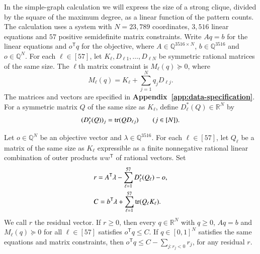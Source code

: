 In the simple-graph calculation we will express the size of a strong
clique, divided by the square of the maximum degree, as a linear
function of the pattern counts. The calculation uses a system with $N=23{,}789$ coordinates, $3{,}516$ linear equations and
$57$ positive semidefinite matrix constraints. Write $Aq=b$ for the
linear equations and $o^{\mathsf T}q$ for the objective, where
$A\in\mathbb Q^{3516\times N}$, $b\in\mathbb Q^{3516}$ and
$o\in\mathbb Q^N$. For each $\ell\in[57]$, let
$K_\ell,D_{\ell1},\ldots,D_{\ell N}$ be symmetric rational matrices of
the same size. The $\ell$th matrix constraint is $M_\ell(q)\succeq0$,
where
\begin{equation}\label{eq:intro-affine-gram}
 M_\ell(q)=K_\ell+\sum_{j=1}^N q_jD_{\ell j}.
\end{equation}
The matrices and vectors are specified in \textbf{Appendix~\ref{app:data-specification}}.
For a symmetric matrix
$Q$ of the same size as $K_\ell$, define
$D_\ell^*(Q)\in\mathbb R^N$ by
\begin{equation}\label{eq:intro-trace-adjoint}
 (D_\ell^*(Q))_j=\operatorname{tr}(QD_{\ell j})\qquad(j\in[N]).
\end{equation}

\begin{lemma}\label{prop:certificate-principle}
Let $o\in\mathbb Q^N$ be an objective vector and
$\lambda\in\mathbb Q^{3516}$. For each $\ell\in[57]$, let $Q_\ell$
be a matrix of the same size as $K_\ell$ expressible as a finite
nonnegative rational linear combination of outer products
$ww^{\mathsf T}$ of rational vectors. Set
\begin{align}
 &r=A^{\mathsf T}\lambda-\sum_{\ell=1}^{57}D_\ell^*(Q_\ell)-o,
 \label{eq:residual}\\
 &C=b^{\mathsf T}\lambda+\sum_{\ell=1}^{57}\operatorname{tr}(Q_\ell K_\ell).
 \label{eq:dual-value}
\end{align}
We call $r$ the residual vector. If $r\geq0$, then every $q\in\mathbb R^N$ with $q\geq0$, $Aq=b$ and
$M_\ell(q)\succeq0$ for all $\ell\in[57]$ satisfies $o^{\mathsf T}q\leq C$.
If $q\in[0,1]^N$ satisfies the same equations and matrix constraints,
then $o^{\mathsf T}q\leq C-\sum_{j:r_j<0}r_j$, for any residual $r$.
\end{lemma}

